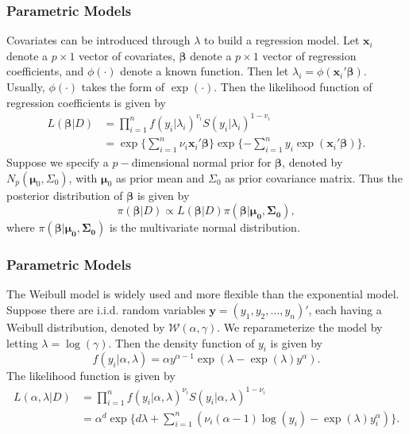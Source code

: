 \documentclass{beamer}
\begin{document}
	\begin{frame}
		\frametitle{Parametric Models}
		Covariates can be introduced through $\lambda$ to build a regression model. Let $\boldsymbol{x}_i$ denote a $p\times1$ vector of covariates, $\boldsymbol{\beta}$ denote a $p\times1$ vector of regression coefficients, and $\phi(\cdot)$ denote a known function. Then let $\lambda_i = \phi( \boldsymbol{x}_i'\boldsymbol{\beta})$. Usually, $\phi(\cdot)$ takes the form of $\exp(\cdot)$. Then the likelihood function of regression coefficients is given by 
		\begin{align*}
			L(\boldsymbol{\beta} | D) & = \prod_{i = 1}^{n}f(y_i | \lambda_i) ^ {v_i}S(y_i | \lambda_i) ^ {1 - v_i} \\
			& = \exp\{\sum_{i = 1}^{n}\nu_i\boldsymbol{x}_i'\boldsymbol{\beta}\}\exp\{-\sum_{i = 1}^{n}y_i\exp(\boldsymbol{x}_i'\boldsymbol{\beta})\}.
		\end{align*}
		Suppose we specify a $p-$dimensional normal prior for $\boldsymbol{\beta}$, denoted by $N_p(\boldsymbol{\mu}_0, \Sigma_0)$, with 
		$\boldsymbol{\mu}_0$ as prior mean and $\Sigma_0$ as prior covariance matrix. Thus the posterior distribution of $\boldsymbol{\beta}$ is given by 
		\[
		\pi(\boldsymbol{\beta} | D) \propto L(\boldsymbol{\beta} | D)\pi(\boldsymbol{\beta} | \boldsymbol{\mu_0, \Sigma_0}),
		\]
		where $\pi(\boldsymbol{\beta} | \boldsymbol{\mu_0, \Sigma_0})$ is the multivariate normal distribution.
	\end{frame}
	
	\begin{frame}
		\frametitle{Parametric Models}
		The Weibull model is widely used and more flexible than the exponential model. Suppose there are i.i.d. random variables $\boldsymbol{y} = (y_1, y_2, \dots, y_n)'$, each having a Weibull distribution, denoted by $\mathcal{W}(\alpha, \gamma)$. We reparameterize the model by letting $\lambda = \log(\gamma)$. Then the density function of $y_i$ is given by 
		\[
		f(y_i | \alpha, \lambda) = \alpha y ^ {\alpha - 1}\exp(\lambda - \exp(\lambda)y ^ {\alpha}).
		\] 
		The likelihood function is given by
		\begin{align*}
			L(\alpha, \lambda | D) & = \prod_{i = 1}^{n}f(y_i | \alpha, \lambda) ^ {\nu_i}S(y_i | \alpha, \lambda) ^ {1 - \nu_i} \\
			& = \alpha ^ d \exp\{d\lambda + \sum_{i = 1}^{n}(\nu_i(\alpha - 1)\log(y_i) - \exp(\lambda)y_i ^ {\alpha})\}.
		\end{align*}
	\end{frame}
	
\end{document}
